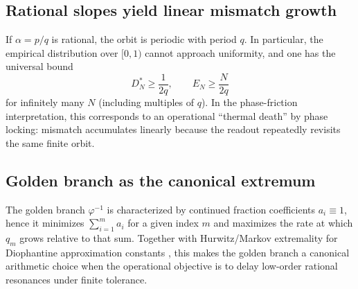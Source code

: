 \subsection{Rational slopes yield linear mismatch growth}
\label{app:rational_linear}

If $\alpha=p/q$ is rational, the orbit is periodic with period $q$. In particular, the empirical distribution over $[0,1)$ cannot approach uniformity, and one has the universal bound
\begin{equation}
  D_N^\ast \ge \frac{1}{2q},
  \qquad
  E_N \ge \frac{N}{2q}
\end{equation}
for infinitely many $N$ (including multiples of $q$).
In the phase-friction interpretation, this corresponds to an operational ``thermal death'' by phase locking: mismatch accumulates linearly because the readout repeatedly revisits the same finite orbit.

\subsection{Golden branch as the canonical extremum}
\label{app:golden_extremum}

The golden branch $\varphi^{-1}$ is characterized by continued fraction coefficients $a_i\equiv 1$, hence it minimizes $\sum_{i=1}^m a_i$ for a given index $m$ and maximizes the rate at which $q_m$ grows relative to that sum.
Together with Hurwitz/Markov extremality for Diophantine approximation constants \cite{Cassels1957}, this makes the golden branch a canonical arithmetic choice when the operational objective is to delay low-order rational resonances under finite tolerance.


